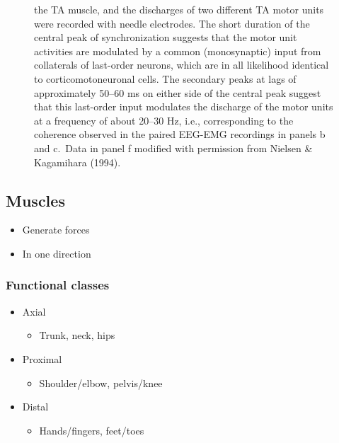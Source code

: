 \documentclass[
  letterpaper,
  DIV=11,
  numbers=noendperiod]{scrartcl}
\providecommand{\tightlist}{%
  \setlength{\itemsep}{0pt}\setlength{\parskip}{0pt}}\usepackage{longtable,booktabs,array}
\begin{document}
\begin{figure}[H]
{the TA muscle, and the discharges of two different TA motor units were
recorded with needle electrodes. The short duration of the central peak
of synchronization suggests that the motor unit activities are modulated
by a common (monosynaptic) input from collaterals of last-order neurons,
which are in all likelihood identical to corticomotoneuronal cells. The
secondary peaks at lags of approximately 50--60 ms on either side of the
central peak suggest that this last-order input modulates the discharge
of the motor units at a frequency of about 20--30 Hz, i.e.,
corresponding to the coherence observed in the paired EEG-EMG recordings
in panels b and c.~Data in panel f modified with permission from Nielsen
\& Kagamihara (1994).}

\end{figure}%

\subsection{Muscles}\label{muscles}

\begin{itemize}
\tightlist
\item
  Generate forces
\item
  In one direction
\end{itemize}

\subsubsection{Functional classes}\label{functional-classes}

\begin{itemize}
\tightlist
\item
  Axial

  \begin{itemize}
  \tightlist
  \item
    Trunk, neck, hips
  \end{itemize}
\item
  Proximal

  \begin{itemize}
  \tightlist
  \item
    Shoulder/elbow, pelvis/knee
  \end{itemize}
\item
  Distal

  \begin{itemize}
  \tightlist
  \item
    Hands/fingers, feet/toes
  \end{itemize}
\end{itemize}
\end{document}
